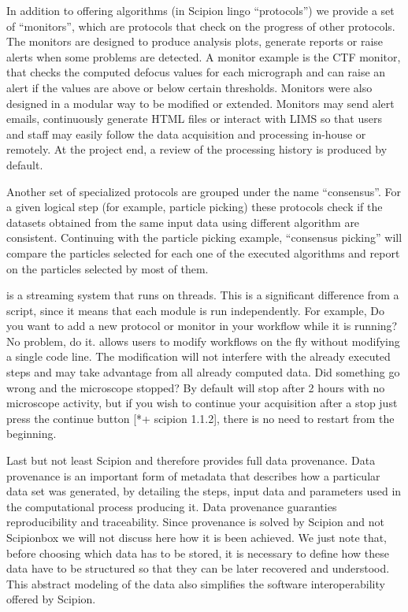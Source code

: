 In addition to offering algorithms (in Scipion lingo ``protocols'') we provide 
a set of ``monitors'', which are protocols that  check on the progress of other protocols. The monitors are designed to produce analysis plots, generate reports or raise alerts when some problems are detected. A monitor example is the CTF monitor, that checks the computed defocus values for
each micrograph and can raise an alert if the values are above or below certain thresholds.
Monitors were also designed in a modular way to be modified or extended. 
Monitors may send alert emails, continuously generate HTML files or interact with LIMS so that users and staff may easily follow the data acquisition and processing in-house or remotely. At the project end, a review of the processing history is produced by default.

Another set of  specialized protocols are grouped under the name ``consensus''. For a given logical step (for example, particle picking) these protocols check if the datasets obtained from the same input data using different algorithm are consistent. Continuing with the particle picking example, ``consensus picking'' will compare the particles selected for each one of the executed algorithms and report on the particles selected by most of them.

\scipionbox is a streaming system that runs on threads. This is a significant difference from a script, since it means that each module is run independently. For example, Do you want to add a new protocol or monitor in your workflow while it is running? No problem, do it. \scipionbox allows users to modify  workflows on the fly without modifying a single code line. The modification will not interfere with the already executed steps and may take advantage from all already computed data. Did something go wrong and the microscope stopped? By default \scipionbox will stop after 2 hours with no microscope activity, but if you wish to continue your acquisition after a stop just press the continue button [*+ scipion 1.1.2], there is no need to restart from the beginning.

Last but not least Scipion and therefore \scipionbox provides full data provenance. Data provenance is an important form of metadata that describes how a particular data set was generated, by detailing the steps, input data and parameters used in the computational process producing it. Data provenance guaranties reproducibility and traceability. Since provenance is solved by Scipion and not Scipionbox we will not discuss here how it is been achieved. We just note that, before choosing which data has to be stored, it is necessary to define how these data have to be structured so that they can be later recovered and understood. This abstract modeling of the data also simplifies the software interoperability offered by Scipion.




 

